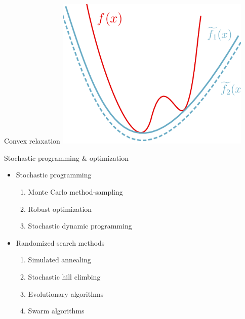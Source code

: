     \begin{frame}{Convex relaxation}
      \centering
      \includegraphics[width = 0.7\textwidth]{images/convex-relaxation.png}
    \end{frame}



    \begin{frame}{Stochastic programming \& optimization}
      \Large
      \begin{spacing}{1.5}
      \begin{itemize}
        \item Stochastic programming
      \begin{enumerate}
        \item Monte Carlo method-sampling
        \item Robust optimization
        \item Stochastic dynamic programming
      \end{enumerate}
      \item Randomized search methods
      \begin{enumerate}
        \item Simulated annealing
        \item Stochastic hill climbing
        \item Evolutionary algorithms
        \item Swarm algorithms
      \end{enumerate}
      \end{itemize}
      \end{spacing}
    \end{frame}
